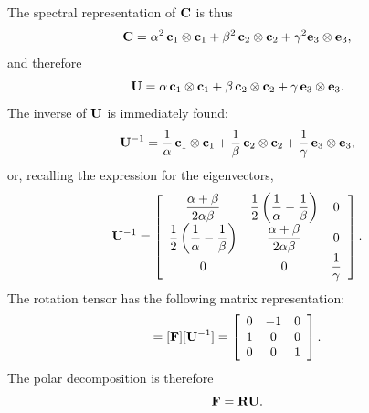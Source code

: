\begin{exercise}
\begin{svolgimento}
\begin{equation}
		\end{equation}
		The spectral representation of $\mathbf{C}$ is thus
		\begin{equation}
			\mathbf{C} = \alpha^2 \, \mathbf{c}_1 \otimes \mathbf{c}_1 + \beta^2 \, \mathbf{c}_2 \otimes \mathbf{c}_2 + \gamma^2 \mathbf{e}_3 \otimes \mathbf{e}_3,
		\end{equation}
		and therefore
		\begin{equation}
			\mathbf{U} = \alpha \, \mathbf{c}_1 \otimes \mathbf{c}_1 + \beta \, \mathbf{c}_2 \otimes \mathbf{c}_2 + \gamma \, \mathbf{e}_3 \otimes \mathbf{e}_3.
		\end{equation}
		The inverse of $\mathbf{U}$ is immediately found:
		\begin{equation}
			\mathbf{U}^{-1} = \frac{1}{\alpha} \, \mathbf{c}_1 \otimes \mathbf{c}_1 + \frac{1}{\beta} \, \mathbf{c}_2 \otimes \mathbf{c}_2 + \frac{1}{\gamma} \, \mathbf{e}_3 \otimes \mathbf{e}_3,
		\end{equation}
		or, recalling the expression for the eigenvectors,
		\begin{equation}
			\mathbf{U}^{-1} = \left[
			\begin{array}{ccc}
				\dfrac{\alpha + \beta}{2 \alpha \beta} & \dfrac{1}{2} \left(\dfrac{1}{\alpha} - \dfrac{1}{\beta}\right) & 0 \\[.2cm]
				\dfrac{1}{2} \left(\dfrac{1}{\alpha} - \dfrac{1}{\beta}\right) & \dfrac{\alpha + \beta}{2 \alpha \beta} & 0 \\[.2cm]
				0 & 0 & \dfrac{1}{\gamma} \\
			\end{array}
			\right].
		\end{equation}
		The rotation tensor has the following matrix representation:
		\begin{equation}
			[\Rb] = [\Fb][\Ub^{-1}] = \left[
			\begin{array}{ccc}
				0 & -1 & 0 \\
				1 & 0 & 0 \\
				0 & 0 & 1 \\
			\end{array}
			\right].
		\end{equation}
		The polar decomposition is therefore
		\begin{equation}
			\mathbf{F} = \mathbf{R} \mathbf{U}.
		\end{equation}
	\end{svolgimento}
\end{exercise}


